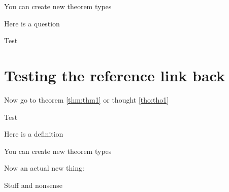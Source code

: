 \documentclass[
  10pt,
  english,
  a4paper]{article}
\theoremstyle{plain}
\theoremstyle{definition}
\theoremstyle{plain}
\theoremstyle{plain}
\theoremstyle{plain}
\theoremstyle{definition}
\theoremstyle{definition}
\theoremstyle{definition}
\theoremstyle{remark}
\theoremstyle{plain}
\let\BeginKnitrBlock\begin \let\EndKnitrBlock\end
\begin{document}
\BeginKnitrBlock{Solution}
{\label{sol:sol1}}You can create new theorem types
\EndKnitrBlock{Solution}

\BeginKnitrBlock{Exercises}
{\iffalse{} (\#Exercises:unnamed-chunk-6) \fi{}}Here is a question
\EndKnitrBlock{Exercises}

\BeginKnitrBlock{solution}
\iffalse{} {Solution. } \fi{}

Test
\EndKnitrBlock{solution}

\hypertarget{testing-the-reference-link-back}{%
\section{Testing the reference link back}\label{testing-the-reference-link-back}}

Now go to theorem \ref{thm:thm1} or thought \ref{tho:tho1}

\BeginKnitrBlock{solution}
\iffalse{} {Solution. } \fi{}

Test
\EndKnitrBlock{solution}
\begingroup\renewcommand{\thedefinition}{\ref{def:truth}}
\BeginKnitrBlock{definition}
{ }Here is a definition
\EndKnitrBlock{definition}
\endgroup\addtocounter{definition}{-1}\begingroup\renewcommand{\theThought}{\ref{tho:tho1}}
\BeginKnitrBlock{Thought}[Bar of \ref{thm:thm1}]
{}You can create new theorem types
\EndKnitrBlock{Thought}
\endgroup\addtocounter{Thought}{-1}
Now an actual new thing:
\BeginKnitrBlock{Thought}
{\label{tho:tho2}}Stuff and nonsense
\EndKnitrBlock{Thought}
\end{document}
